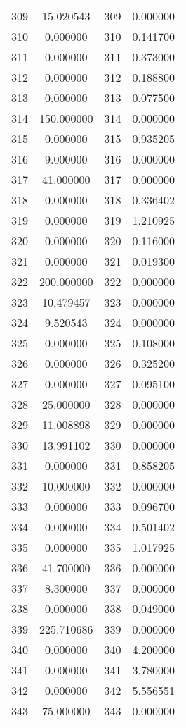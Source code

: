 \documentclass[12pt]{article}
\begin{document}
\begin{longtable}{@{}cccc@{}}
309 & 15.020543 & 309 & 0.000000 \\
310 & 0.000000 & 310 & 0.141700 \\
311 & 0.000000 & 311 & 0.373000 \\
312 & 0.000000 & 312 & 0.188800 \\
313 & 0.000000 & 313 & 0.077500 \\
314 & 150.000000 & 314 & 0.000000 \\
315 & 0.000000 & 315 & 0.935205 \\
316 & 9.000000 & 316 & 0.000000 \\
317 & 41.000000 & 317 & 0.000000 \\
318 & 0.000000 & 318 & 0.336402 \\
319 & 0.000000 & 319 & 1.210925 \\
320 & 0.000000 & 320 & 0.116000 \\
321 & 0.000000 & 321 & 0.019300 \\
322 & 200.000000 & 322 & 0.000000 \\
323 & 10.479457 & 323 & 0.000000 \\
324 & 9.520543 & 324 & 0.000000 \\
325 & 0.000000 & 325 & 0.108000 \\
326 & 0.000000 & 326 & 0.325200 \\
327 & 0.000000 & 327 & 0.095100 \\
328 & 25.000000 & 328 & 0.000000 \\
329 & 11.008898 & 329 & 0.000000 \\
330 & 13.991102 & 330 & 0.000000 \\
331 & 0.000000 & 331 & 0.858205 \\
332 & 10.000000 & 332 & 0.000000 \\
333 & 0.000000 & 333 & 0.096700 \\
334 & 0.000000 & 334 & 0.501402 \\
335 & 0.000000 & 335 & 1.017925 \\
336 & 41.700000 & 336 & 0.000000 \\
337 & 8.300000 & 337 & 0.000000 \\
338 & 0.000000 & 338 & 0.049000 \\
339 & 225.710686 & 339 & 0.000000 \\
340 & 0.000000 & 340 & 4.200000 \\
341 & 0.000000 & 341 & 3.780000 \\
342 & 0.000000 & 342 & 5.556551 \\
343 & 75.000000 & 343 & 0.000000 \\

\end{longtable}
\end{document}
